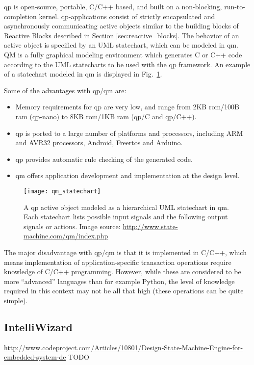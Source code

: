 \gls{qp} is open-source, portable, C/C++ based, and built on a non-blocking, run-to-completion kernel. \gls{qp}-applications consist of strictly encapsulated and asynchronously communicating active objects similar to the building blocks of Reactive Blocks described in Section \ref{sec:reactive_blocks}. The behavior of an active object is specified by an UML statechart, which can be modeled in \gls{qm}. QM is a fully graphical modeling environment which generates C or C++ code according to the UML statecharts to be used with the \gls{qp} framework. An example of a statechart modeled in \gls{qm} is displayed in Fig.~\ref{figure:qm_statechart}.

Some of the advantages with \gls{qp}/\gls{qm} are:
\begin{itemize}
	\item Memory requirements for \gls{qp} are very low, and range from 2KB \gls{rom}/100B \gls{ram} (\gls{qp}-nano) to 8KB \gls{rom}/1KB \gls{ram} (\gls{qp}/C and \gls{qp}/C++).
	\item \gls{qp} is ported to a large number of platforms and processors, including ARM and AVR32 processors, Android, Free\gls{rtos} and Arduino.
	\item \gls{qp} provides automatic rule checking of the generated code.
	\item \gls{qm} offers application development and implementation at the design level.
\end{itemize}

\begin{figure}[h]
	\centering
	\texttt{[image: qm\_statechart]}
	\caption[An UML statechart in QM]{A \gls{qp} active object modeled as a hierarchical UML statechart in \gls{qm}. Each statechart lists possible input signals and the following output signals or actions. Image source: \url{http://www.state-machine.com/qm/index.php} \label{figure:qm_statechart} }
\end{figure}

The major disadvantage with \gls{qp}/\gls{qm} is that it is implemented in C/C++, which means implementation of application-specific transaction operations require knowledge of C/C++ programming. However, while these are considered to be more “advanced” languages than for example Python, the level of knowledge required in this context may not be all that high (these operations can be quite simple).

\subsection{IntelliWizard}
\label{sec:intelliwizard}
\url{http://www.codeproject.com/Articles/10801/Design-State-Machine-Engine-for-embedded-system-de}
TODO

